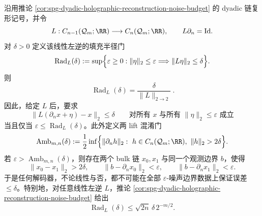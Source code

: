 \begin{proposition}\label{distill:gromov-filling_budget_closure_families-spg-rad-linear-confusion-gate}
沿用推论 \ref{cor:spg-dyadic-holographic-reconstruction-noise-budget} 的 dyadic 链复形记号，并令
\[
L:C_{n-1}(\mathcal Q_m;\RR)\longrightarrow C_n(\mathcal Q_m;\RR),
\qquad L\partial_n=\mathrm{Id}.
\]
对 \(\delta>0\) 定义该线性左逆的填充半径门
\[
\operatorname{Rad}_L(\delta):=\sup\Bigl\{\varepsilon\ge0:
\|\eta\|_2\le\varepsilon\Longrightarrow \|L\eta\|_2\le\delta\Bigr\}.
\]
则
\[
\boxed{\ \operatorname{Rad}_L(\delta)=\frac{\delta}{\|L\|_{2\to2}}\ }.
\]
因此，给定 \(L\) 后，要求
\[
\|L(\partial_nx+\eta)-x\|_2\le\delta
\qquad\text{对所有 }x\text{ 与所有 }\|\eta\|_2\le\varepsilon\text{ 成立}
\]
当且仅当 \(\varepsilon\le \operatorname{Rad}_L(\delta)\)。此外定义两 lift 混淆门
\[
\operatorname{Amb}_{m,n}(\delta):=\frac12\inf\Bigl\{\|\partial_nh\|_2:\ h\in C_n(\mathcal Q_m;\RR),\ \|h\|_2>2\delta\Bigr\}.
\]
若 \(\varepsilon>\operatorname{Amb}_{m,n}(\delta)\)，则存在两个 bulk 链 \(x_0,x_1\) 与同一个观测边界 \(b\)，使得
\[
\|x_0-x_1\|_2>2\delta,\qquad
\|b-\partial_nx_0\|_2<\varepsilon,\qquad
\|b-\partial_nx_1\|_2<\varepsilon.
\]
于是任何解码器，不论线性与否，都不可能在全部 \(\varepsilon\)-噪声边界数据上保证误差 \(\le\delta\)。特别地，对任意线性左逆 \(L\)，推论 \ref{cor:spg-dyadic-holographic-reconstruction-noise-budget} 给出
\[
\operatorname{Rad}_L(\delta)\le \sqrt{2n}\,\delta\,2^{-m/2}.
\]
\end{proposition}

